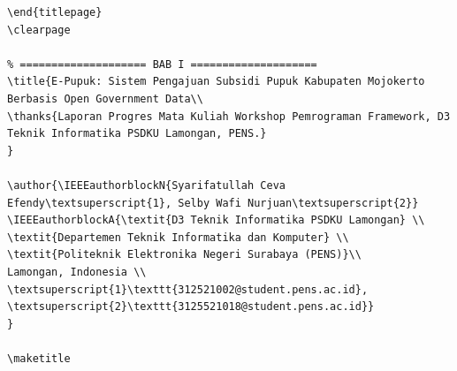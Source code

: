 \documentclass[conference]{IEEEtran}
\begin{document}
\begin{lstlisting}
\end{titlepage}
\clearpage

% ==================== BAB I ====================
\title{E-Pupuk: Sistem Pengajuan Subsidi Pupuk Kabupaten Mojokerto Berbasis Open Government Data\\
\thanks{Laporan Progres Mata Kuliah Workshop Pemrograman Framework, D3 Teknik Informatika PSDKU Lamongan, PENS.}
}

\author{\IEEEauthorblockN{Syarifatullah Ceva Efendy\textsuperscript{1}, Selby Wafi Nurjuan\textsuperscript{2}}
\IEEEauthorblockA{\textit{D3 Teknik Informatika PSDKU Lamongan} \\
\textit{Departemen Teknik Informatika dan Komputer} \\
\textit{Politeknik Elektronika Negeri Surabaya (PENS)}\\
Lamongan, Indonesia \\
\textsuperscript{1}\texttt{312521002@student.pens.ac.id}, \textsuperscript{2}\texttt{3125521018@student.pens.ac.id}}
}

\maketitle


\end{lstlisting}
\end{document}

